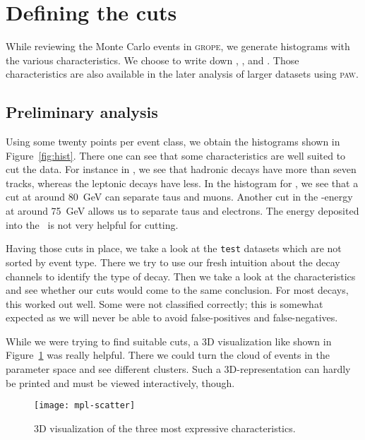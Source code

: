 \documentclass[11pt, english, fleqn, DIV=15, headinclude, BCOR=2cm]{scrreprt}
\begin{document}
\section{Defining the cuts}

While reviewing the Monte Carlo events in \textsc{grope}, we generate
histograms with the various characteristics. We choose to write down
\ncharged{}, \sump{}, \eecal{} and \ehcal{}. Those characteristics are also
available in the later analysis of larger datasets using \textsc{paw}.

\subsection{Preliminary analysis}

Using some twenty points per event class, we obtain the histograms shown in
Figure~\ref{fig:hist}. There one can see that some characteristics are well
suited to cut the data. For instance in \ncharged, we see that hadronic decays
have more than seven tracks, whereas the leptonic decays have less. In the
histogram for \sump, we see that a cut at around \SI{80}{\giga\electronvolt}
can separate taus and muons. Another cut in the \ecal-energy at around
\SI{75}{\giga\electronvolt} allows us to separate taus and electrons. The
energy deposited into the \hcal\ is not very helpful for cutting.



Having those cuts in place, we take a look at the \texttt{test} datasets which
are not sorted by event type. There we try to use our fresh intuition about the
decay channels to identify the type of decay. Then we take a look at the
characteristics and see whether our cuts would come to the same conclusion. For
most decays, this worked out well. Some were not classified correctly; this is
somewhat expected as we will never be able to avoid false-positives and
false-negatives.

While we were trying to find suitable cuts, a 3D visualization like shown in
Figure~\ref{fig:mpl-scatter} was really helpful. There we could turn the cloud
of events in the parameter space and see different clusters. Such a
3D-representation can hardly be printed and must be viewed interactively,
though.

\begin{figure}
    \centering
    \texttt{[image: mpl-scatter]}
    \caption{%
        3D visualization of the three most expressive characteristics.
    }
    \label{fig:mpl-scatter}
\end{figure}
\end{document}
